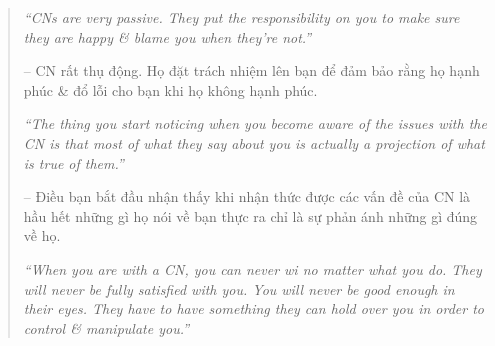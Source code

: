\documentclass{article}
\begin{document}
\begin{enumerate}
\begin{quotation}
		{\it``CNs are very passive. They put the responsibility on you to make sure they are happy \& blame you when they're not.''}
		
		-- CN rất thụ động. Họ đặt trách nhiệm lên bạn để đảm bảo rằng họ hạnh phúc \& đổ lỗi cho bạn khi họ không hạnh phúc.		
		
		{\it``The thing you start noticing when you become aware of the issues with the CN is that most of what they say about you is actually a projection of what is true of them.''}
		
		-- Điều bạn bắt đầu nhận thấy khi nhận thức được các vấn đề của CN là hầu hết những gì họ nói về bạn thực ra chỉ là sự phản ánh những gì đúng về họ.
		
		{\it``When you are with a CN, you can never wi no matter what you do. They will never be fully satisfied with you. You will never be good enough in their eyes. They have to have something they can hold over you in order to control \& manipulate you.''}
		

\end{quotation}
\end{enumerate}
\end{document}
